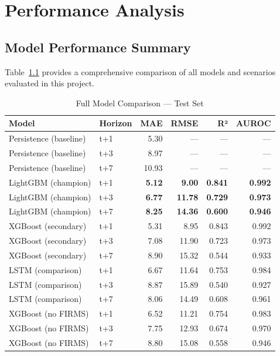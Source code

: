 \chapter{Performance Analysis}
\label{ch:performance}

\section{Model Performance Summary}

Table~\ref{tab:full_comparison} provides a comprehensive comparison of all models
and scenarios evaluated in this project.

\begin{table}[H]
\centering
\caption{Full Model Comparison — Test Set}
\label{tab:full_comparison}
\begin{tabular}{llrrrr}
\toprule
\textbf{Model} & \textbf{Horizon} & \textbf{MAE} & \textbf{RMSE} & \textbf{R²} & \textbf{AUROC} \\
\midrule
Persistence (baseline) & t+1 & 5.30  & ---   & ---   & --- \\
Persistence (baseline) & t+3 & 8.97  & ---   & ---   & --- \\
Persistence (baseline) & t+7 & 10.93 & ---   & ---   & --- \\
\midrule
LightGBM (champion)    & t+1 & \textbf{5.12}  & \textbf{9.00}  & \textbf{0.841} & \textbf{0.992} \\
LightGBM (champion)    & t+3 & \textbf{6.77}  & \textbf{11.78} & \textbf{0.729} & \textbf{0.973} \\
LightGBM (champion)    & t+7 & \textbf{8.25}  & \textbf{14.36} & \textbf{0.600} & \textbf{0.946} \\
\midrule
XGBoost (secondary)    & t+1 & 5.31  & 8.95  & 0.843 & 0.992 \\
XGBoost (secondary)    & t+3 & 7.08  & 11.90 & 0.723 & 0.973 \\
XGBoost (secondary)    & t+7 & 8.90  & 15.32 & 0.544 & 0.933 \\
\midrule
LSTM (comparison)      & t+1 & 6.67  & 11.64 & 0.753 & 0.984 \\
LSTM (comparison)      & t+3 & 8.87  & 15.89 & 0.540 & 0.927 \\
LSTM (comparison)      & t+7 & 8.06  & 14.49 & 0.608 & 0.961 \\
\midrule
XGBoost (no FIRMS)     & t+1 & 6.52  & 11.21 & 0.754 & 0.983 \\
XGBoost (no FIRMS)     & t+3 & 7.75  & 12.93 & 0.674 & 0.970 \\
XGBoost (no FIRMS)     & t+7 & 8.80  & 15.08 & 0.558 & 0.946 \\
\bottomrule
\end{tabular}
\end{table}

